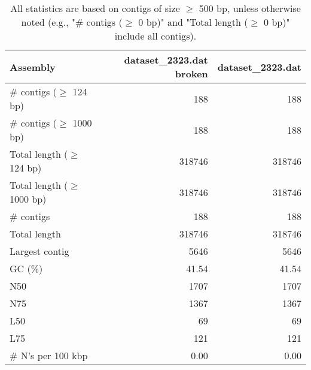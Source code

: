 \documentclass[12pt,a4paper]{article}
\begin{document}
\begin{table}[ht]
\begin{center}
\caption{All statistics are based on contigs of size $\geq$ 500 bp, unless otherwise noted (e.g., "\# contigs ($\geq$ 0 bp)" and "Total length ($\geq$ 0 bp)" include all contigs).}
\begin{tabular}{|l*{2}{|r}|}
\hline
Assembly & dataset\_2323.dat broken & dataset\_2323.dat \\ \hline
\# contigs ($\geq$ 124 bp) & 188 & 188 \\ \hline
\# contigs ($\geq$ 1000 bp) & 188 & 188 \\ \hline
Total length ($\geq$ 124 bp) & 318746 & 318746 \\ \hline
Total length ($\geq$ 1000 bp) & 318746 & 318746 \\ \hline
\# contigs & 188 & 188 \\ \hline
Total length & 318746 & 318746 \\ \hline
Largest contig & 5646 & 5646 \\ \hline
GC (\%) & 41.54 & 41.54 \\ \hline
N50 & 1707 & 1707 \\ \hline
N75 & 1367 & 1367 \\ \hline
L50 & 69 & 69 \\ \hline
L75 & 121 & 121 \\ \hline
\# N's per 100 kbp & 0.00 & 0.00 \\ \hline
\end{tabular}
\end{center}
\end{table}
\end{document}
